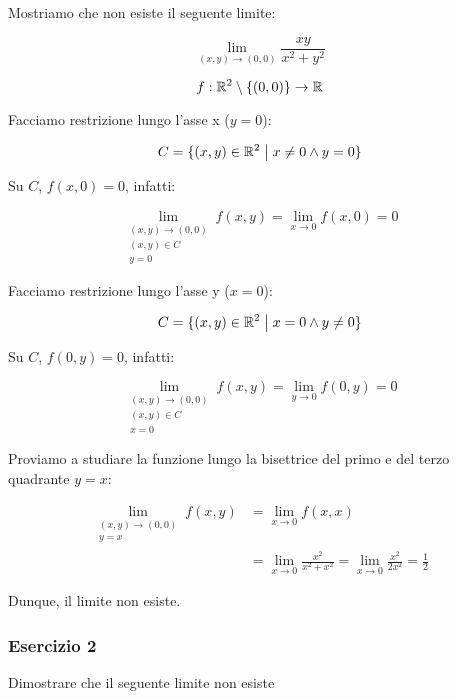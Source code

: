 Mostriamo che non esiste il seguente limite:

\[
    \lim_{ (x,y) \to (0,0) } \frac{xy}{x^{2}+y^{2}}
\]

\[
    f: \mathbb{R}^2 \setminus \{(0,0)\} \to \mathbb{R}
\]

Facciamo restrizione lungo l'asse x (\(y=0\)):

\[
    C = \{(x,y) \in \mathbb{R}^2 \;\big|\; x \neq 0 \land y = 0\}
\]

Su \(C\), \(f(x,0) = 0\), infatti:

\[
    \lim_{\begin{smallmatrix} (x,y) \to (0,0) \\ (x,y) \in C \\ y=0 \end{smallmatrix}} f(x,y) = \lim_{x \to 0} f(x, 0) = 0
\]

Facciamo restrizione lungo l'asse y (\(x=0\)):

\[
    C = \{(x,y) \in \mathbb{R}^2 \;\big|\; x = 0 \land y \neq 0\}
\]

Su \(C\), \(f(0, y) = 0\), infatti:

\[
    \lim_{\begin{smallmatrix} (x,y) \to (0,0) \\ (x,y) \in C \\ x=0 \end{smallmatrix}} f(x,y) = \lim_{y \to 0} f(0, y)  = 0
\]

Proviamo a studiare la funzione lungo la bisettrice del primo e del terzo quadrante \(y=x\):

\begin{align*}
    \lim_{\begin{smallmatrix} (x,y) \to (0,0) \\ y=x \end{smallmatrix}} f(x,y) & = \lim_{ x \to 0 } f(x,x)                    \\
                                                                               & = \lim_{ x \to 0 } \frac{x^{2}}{x^{2}+x^{2}}
    = \lim_{ x \to 0 } \frac{x^{2}}{2x^{2}}
    = \frac{1}{2}
\end{align*}

Dunque, il limite non esiste.

\filbreak{}
\subsubsection*{Esercizio 2}

Dimostrare che il seguente limite non esiste

